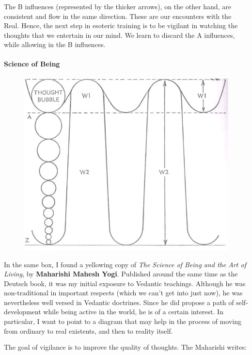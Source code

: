 The B influences (represented by the thicker arrows), on the other hand, are consistent and flow in the same direction. These are our encounters with the Real. Hence, the next step in esoteric training is to be vigilant in watching the thoughts that we entertain in our mind. We learn to discard the A influences, while allowing in the B influences.

\paragraph{Science of Being}

\begin{figure}
 \includegraphics[scale=.35]{a20141010Subration-img002.jpg}
\end{figure} 

In the same box, I found a yellowing copy of \emph{The Science of Being and the Art of Living}, by \textbf{Maharishi Mahesh Yogi}. Published around the same time as the Deutsch book, it was my initial exposure to Vedantic teachings. Although he was non-traditional in important respects (which we can't get into just now), he was nevertheless well versed in Vedantic doctrines. Since he did propose a path of self-development while being active in the world, he is of a certain interest. In particular, I want to point to a diagram that may help in the process of moving from ordinary to real existents, and then to reality itself.

The goal of vigilance is to improve the quality of thoughts. The Maharishi writes:

